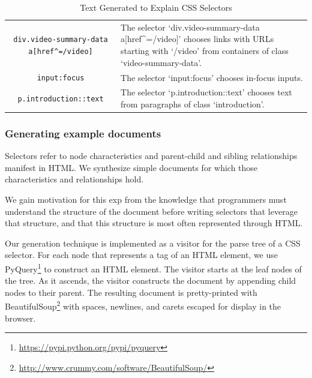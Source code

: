 \begin{table}[t]
\caption{Text Generated to Explain CSS Selectors}
\label{tab:css_descriptions}
\centering
\begin{tabular}{ST}
\toprule
{} &  \\
\midrule
\texttt{div.video-summary-data a[href\^{}=/video]} & The selector `div.video-summary-data a[href\^{}=/video]' chooses links with URLs starting with `/video' from containers of class `video-summary-data'. \\ \midrule
\texttt{input:focus} & The selector `input:focus' chooses in-focus inputs. \\ \midrule
\texttt{p.introduction::text} & The selector `p.introduction::text' chooses text from paragraphs of class `introduction'. \\ \bottomrule
\end{tabular}
\end{table}

\subsubsection{Generating example documents}

\begin{changes}
Selectors refer to node characteristics and parent-child and sibling relationships manifest in HTML\@.
We synthesize simple documents for which those characteristics and relationships hold.
\end{changes}
{}
We gain motivation for this \gls{exp} from the knowledge that programmers must understand the structure of the document before writing selectors that leverage that structure, and that this structure is most often represented through HTML\@.
\fi

Our generation technique is implemented as a visitor for the parse tree of a CSS selector.
For each node that represents a tag of an HTML element, we use PyQuery\footnote{\url{https://pypi.python.org/pypi/pyquery}} to construct an HTML element.
The visitor starts at the leaf nodes of the tree.
As it ascends, the visitor constructs the document by appending child nodes to their parent.
The resulting document is pretty-printed with BeautifulSoup\footnote{\url{http://www.crummy.com/software/BeautifulSoup/}} with spaces, newlines, and carets escaped for display in the browser.

